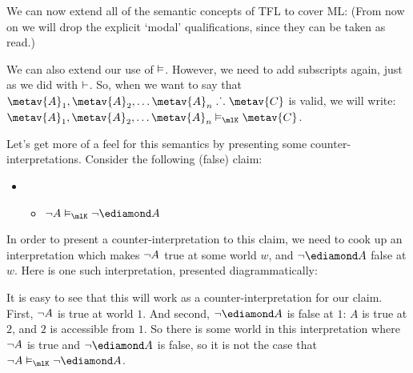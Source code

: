 We can now extend all of the semantic concepts of TFL to cover ML:
(From now on we will drop the explicit `modal' qualifications, since they can be taken as read.)

We can also extend our use of $\vDash$. However, we need to add subscripts again, just as we did with $\vdash$. So, when we want to say that $\metav{A}_1,\metav{A}_2, \dots \metav{A}_n\therefore\metav{C}$ is valid, we will write: $\metav{A}_1,\metav{A}_2, \dots \metav{A}_n\entails_\mlK\metav{C}$. 

Let's get more of a feel for this semantics by presenting some counter-interpretations. Consider the following (false) claim:
\begin{itemize}
	\item[]
	      \begin{itemize}
		      \item[]$\enot A\entails_\mlK \enot \ediamond A$
	      \end{itemize}
\end{itemize}
In order to present a counter-interpretation to this claim, we need to cook up an interpretation which makes $\neg A$ true at some world $w$, and $\enot\ediamond A$ false at $w$. Here is one such interpretation, presented diagrammatically:
\begin{center}
\end{center}
It is easy to see that this will work as a counter-interpretation for our claim. First, $\neg A$ is true at world $1$. And second, $\enot\ediamond A$ is false at $1$: $A$ is true at $2$, and $2$ is accessible from $1$. So there is some world in this interpretation where $\neg A$ is true and $\enot\ediamond A$ is false, so it is not the case that $\enot A\entails_\mlK\enot\ediamond A$.


